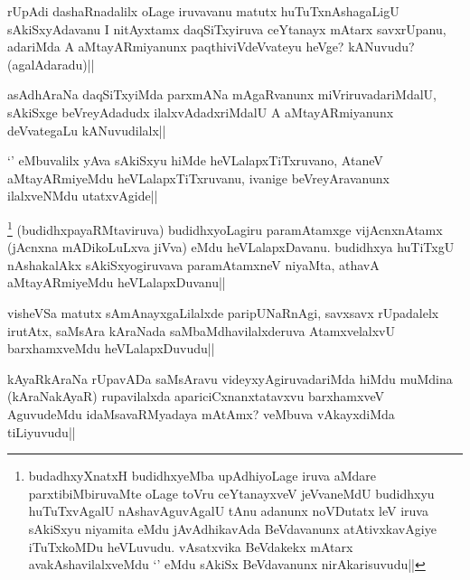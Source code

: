 \begin{artha}
rUpAdi dashaRnadalilx oLage iruvavanu matutx huTuTxnAshagaLigU sAkiSxyAdavanu I nitAyxtamx daqSiTxyiruva ceYtanayx mAtarx savxrUpanu, adariMda A aMtayARmiyanunx paqthiviVdeVvateyu heVge? kANuvudu? (agalAdaradu)||
\end{artha}

\begin{artha}
asAdhAraNa daqSiTxyiMda parxmANa mAgaRvanunx miVriruvadariMdalU, sAkiSxge beVreyAdadudx ilalxvAdadxriMdalU A aMtayARmiyanunx deVvategaLu kANuvudilalx||
\end{artha}


\begin{artha}
`\stext ' eMbuvalilx yAva sAkiSxyu hiMde heVLalapxTiTxruvano, AtaneV aMtayARmiyeMdu heVLalapxTiTxruvanu, ivanige beVreyAravanunx ilalxveNMdu utatxvAgide|| 
\end{artha}


\begin{artha}
\footnote[1]{budadhxyXnatxH budidhxyeMba upAdhiyoLage iruva aMdare parxtibiMbiruvaMte oLage toVru ceYtanayxveV jeVvaneMdU budidhxyu huTuTxvAgalU nAshavAguvAgalU tAnu adanunx noVDutatx leV iruva sAkiSxyu niyamita eMdu jAvAdhikavAda BeVdavanunx atAtivxkavAgiye iTuTxkoMDu heVLuvudu. vAsatxvika BeVdakekx mAtarx avakAshavilalxveMdu `\stext' eMdu sAkiSx BeVdavanunx nirAkarisuvudu||} (budidhxpayaRMtaviruva) budidhxyoLagiru paramAtamxge vijAcnxnAtamx (jAcnxna mADikoLuLxva jiVva) eMdu heVLalapxDavanu. budidhxya huTiTxgU nAshakalAkx sAkiSxyogiruvava paramAtamxneV niyaMta, athavA aMtayARmiyeMdu heVLalapxDuvanu||
\end{artha}


\begin{artha}
visheVSa matutx sAmAnayxgaLilalxde paripUNaRnAgi, savxsavx rUpadalelx irutAtx, saMsAra kAraNada saMbaMdhavilalxderuva AtamxvelalxvU barxhamxveMdu heVLalapxDuvudu||
\end{artha}

\begin{artha}%
kAyaRkAraNa rUpavADa saMsAravu videyxyAgiruvadariMda hiMdu muMdina (kAraNakAyaR) rupavilalxda apariciCxnanxtatavxvu barxhamxveV AguvudeMdu idaMsavaRMyadaya mAtAmx? veMbuva vAkayxdiMda tiLiyuvudu||
\end{artha}

